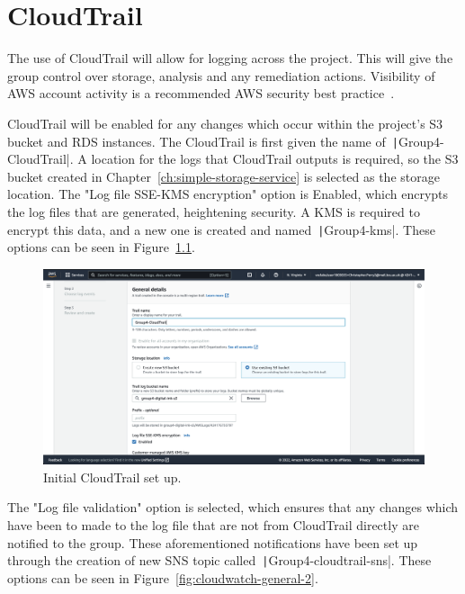 \chapter{CloudTrail}\label{ch:cloudtrail}

The use of CloudTrail will allow for logging across the project.
This will give the group control over storage, analysis and any remediation actions.
Visibility of AWS account activity is a recommended AWS security best practice~\parencite{amazon2022cloudtrail}.

CloudTrail will be enabled for any changes which occur within the project's S3 bucket and RDS instances.
The CloudTrail is first given the name of~\texttt|Group4-CloudTrail|.
A location for the logs that CloudTrail outputs is required, so the S3 bucket created in
Chapter~\ref{ch:simple-storage-service} is selected as the storage location.
The "Log file SSE-KMS encryption" option is Enabled, which encrypts the log files that are generated, heightening
security.
A KMS is required to encrypt this data, and a new one is created and named~\texttt|Group4-kms|.
These options can be seen in Figure~\ref{fig:cloudwatch-general-1}.

\begin{figure}[!htbp]
    \centering
    \includegraphics[width=\textwidth]{resources/cloudtrail/cloudtrail-general-1}
    \caption{Initial CloudTrail set up.}
    \label{fig:cloudwatch-general-1}
\end{figure}

\clearpage
The "Log file validation" option is selected, which ensures that any changes which have been to made to the log file
that are not from CloudTrail directly are notified to the group.
These aforementioned notifications have been set up through the creation of new SNS topic
called~\texttt|Group4-cloudtrail-sns|.
These options can be seen in Figure~\ref{fig:cloudwatch-general-2}.

